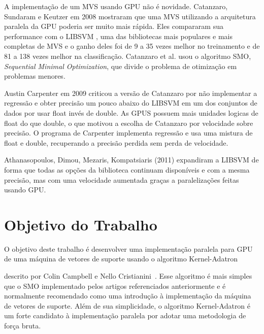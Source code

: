 \par
A implementação de um MVS usando GPU não é novidade. Catanzaro, Sundaram e Keutzer em 2008 \cite{art:REF_ART_1} mostraram que uma MVS utilizando a arquitetura paralela da GPU poderia ser muito mais rápida. Eles compararam sua performance com o LIBSVM \cite{art:LIBSVM}, uma das bibliotecas mais populares e mais completas de MVS e o ganho deles foi de 9 a 35 vezes melhor no treinamento e de 81 a 138 vezes melhor na classificação. Catanzaro et al. usou o algoritmo SMO, \emph{Sequential Minimal Optimization}, que divide o problema de otimização em problemas menores.
\par
Austin Carpenter em 2009 \cite{art:REF_ART_2} criticou a versão de Catanzaro por não implementar a regressão e obter precisão um pouco abaixo do LIBSVM em um dos conjuntos de dados por usar float invés de double. As GPUS possuem mais unidades logicas de float do que double, o que motivou a escolha de Catanzaro por velocidade sobre precisão. O programa de Carpenter implementa regressão e usa uma mistura de float e double, recuperando a precisão perdida sem perda de velocidade.
\par
Athanasopoulos, Dimou, Mezaris, Kompatsiaris (2011)\cite{art:REF_ART_3} expandiram a LIBSVM de forma que todas as opções da biblioteca continuam disponíveis e com a mesma precisão, mas com uma velocidade aumentada graças a paralelizações feitas usando GPU.\par


\section{Objetivo do Trabalho}\label{sec:LABEL_CHP_1_SEC_B}
O objetivo deste trabalho é desenvolver 
uma implementação paralela para GPU de
uma máquina de vetores de suporte usando o algoritmo Kernel-Adatron 


descrito por Colin Campbell e Nello Cristianini~\cite{art:LIVRO_KAA}. Esse algoritmo é mais simples que o SMO implementado pelos artigos referenciados anteriormente e é normalmente recomendado como uma introdução à implementação da máquina de vetores de suporte.
Além de sua simplicidade, o algoritmo Kernel-Adatron é um forte candidato à implementação paralela por adotar uma metodologia de força bruta. %
\par

